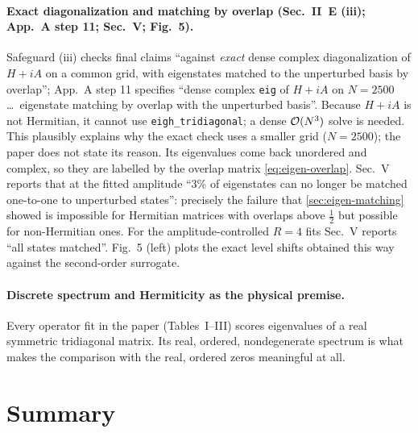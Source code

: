 \paragraph{Exact diagonalization and matching by overlap (Sec.~II~E (iii); App.~A step 11; Sec.~V; Fig.~5).} Safeguard (iii) checks final claims ``against \emph{exact} dense complex diagonalization of $H+iA$ on a common grid, with eigenstates matched to the unperturbed basis by overlap''; App.~A step 11 specifies ``dense complex \texttt{eig} of $H+iA$ on $N=2500$ \dots\ eigenstate matching by overlap with the unperturbed basis''. Because $H+iA$ is not Hermitian, it cannot use \texttt{eigh\_tridiagonal}; a dense $\mathcal{O}(N^3)$ solve is needed. This plausibly explains why the exact check uses a smaller grid ($N=2500$); the paper does not state its reason. Its eigenvalues come back unordered and complex, so they are labelled by the overlap matrix \eqref{eq:eigen-overlap}. Sec.~V reports that at the fitted amplitude ``3\% of eigenstates can no longer be matched one-to-one to unperturbed states'': precisely the failure that \cref{sec:eigen-matching} showed is impossible for Hermitian matrices with overlaps above $\tfrac12$ but possible for non-Hermitian ones. For the amplitude-controlled $R=4$ fits Sec.~V reports ``all states matched''. Fig.~5 (left) plots the exact level shifts obtained this way against the second-order surrogate.

\paragraph{Discrete spectrum and Hermiticity as the physical premise.} Every operator fit in the paper (Tables~I--III) scores eigenvalues of a real symmetric tridiagonal matrix. Its real, ordered, nondegenerate spectrum is what makes the comparison with the real, ordered zeros meaningful at all.

\section{Summary}

